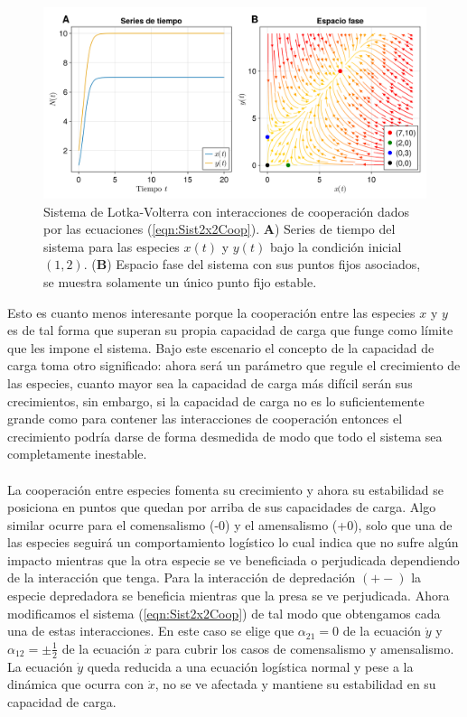 \begin{ejemplo}
	\begin{figure}[h!]
		\centering
		\includegraphics[scale=0.24]{../Imagenes/Cooperacion de especies}
		\caption{Sistema de Lotka-Volterra con interacciones de cooperación dados por las ecuaciones (\ref{eqn:Sist2x2Coop}). \textbf{A}) Series de tiempo del sistema para las especies $x(t)$ y $y(t)$ bajo la condición inicial $(1,2)$. (\textbf{B}) Espacio fase del sistema con sus puntos fijos asociados, se muestra solamente un único punto fijo estable.}
		\label{fig:CooperacionEspecies}
	\end{figure}
	 Esto es cuanto menos interesante porque la cooperación entre las especies $x$ y $y$ es de tal forma que superan su propia capacidad de carga que funge como límite que les impone el sistema. Bajo este escenario el concepto de la capacidad de carga toma otro significado: ahora será un parámetro que regule el crecimiento de las especies, cuanto mayor sea la capacidad de carga más difícil serán sus crecimientos, sin embargo, si la capacidad de carga no es lo suficientemente grande como para contener las interacciones de cooperación entonces el crecimiento podría darse de forma desmedida de modo que todo el sistema sea completamente inestable.\\
	 \\
 	La cooperación entre especies fomenta su crecimiento y ahora su estabilidad se posiciona en puntos que quedan por arriba de sus capacidades de carga. Algo similar ocurre para el comensalismo (-0) y el amensalismo (+0), solo que una de las especies seguirá un comportamiento logístico lo cual indica que no sufre algún impacto mientras que la otra especie se ve beneficiada o perjudicada dependiendo de la interacción que tenga. Para la interacción de depredación $(+-)$ la especie depredadora se beneficia mientras que la presa se ve perjudicada.
 	\newpage
 	Ahora modificamos el sistema (\ref{eqn:Sist2x2Coop}) de tal modo que obtengamos cada una de estas interacciones. En este caso se elige que $\alpha_{21}=0$ de la ecuación $\dot{y}$ y $\alpha_{12}=\pm\frac{1}{2}$ de la ecuación $\dot{x}$ para cubrir los casos de comensalismo y amensalismo. La ecuación $\dot{y}$ queda reducida a una ecuación logística normal y pese a la dinámica que ocurra con $\dot{x}$, no se ve afectada y mantiene su estabilidad en su capacidad de carga. 

\end{ejemplo}
